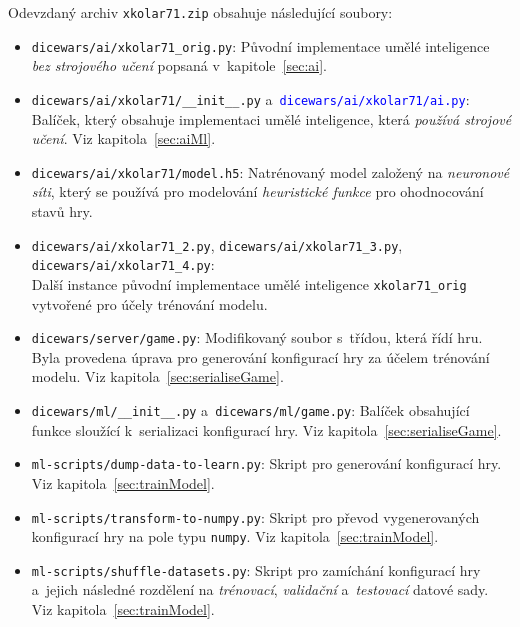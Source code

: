 \documentclass[11pt, a4paper]{article}
\theoremstyle{definition}
\begin{document}
Odevzdaný archiv \texttt{xkolar71.zip} obsahuje následující soubory:
\begin{itemize}
    \item
        \texttt{dicewars/ai/xkolar71\_orig.py}: Původní implementace umělé
        inteligence \emph{bez strojového učení} popsaná
        v~kapitole~\ref{sec:ai}.

    \item
        \texttt{dicewars/ai/xkolar71/\_\_init\_\_.py}
        a~\textcolor{blue}{\texttt{dicewars/ai/xkolar71/ai.py}}: Balíček,
        který obsahuje implementaci umělé inteligence, která \emph{používá
        strojové učení}. Viz kapitola~\ref{sec:aiMl}.

    \item
        \texttt{dicewars/ai/xkolar71/model.h5}: Natrénovaný model založený
        na \emph{neuronové síti}, který se používá pro modelování
        \emph{heuristické funkce} pro ohodnocování stavů hry.

    \item
        \texttt{dicewars/ai/xkolar71\_2.py},
        \texttt{dicewars/ai/xkolar71\_3.py},
        \texttt{dicewars/ai/xkolar71\_4.py}: \\
        Další instance původní implementace umělé inteligence
        \texttt{xkolar71\_orig} vytvořené pro účely trénování modelu.

    \item
        \texttt{dicewars/server/game.py}: Modifikovaný soubor s~třídou, která
        řídí hru. Byla provedena úprava pro generování konfigurací hry za
        účelem trénování modelu. Viz kapitola~\ref{sec:serialiseGame}.

    \item
        \texttt{dicewars/ml/\_\_init\_\_.py} a~\texttt{dicewars/ml/game.py}:
        Balíček obsahující funkce sloužící k~serializaci konfigurací hry.
        Viz kapitola~\ref{sec:serialiseGame}.

    \item
        \texttt{ml-scripts/dump-data-to-learn.py}: Skript pro generování
        konfigurací hry. Viz kapitola~\ref{sec:trainModel}.

    \item
        \texttt{ml-scripts/transform-to-numpy.py}: Skript pro převod
        vygenerovaných konfigurací hry na pole typu \texttt{numpy}. Viz
        kapitola~\ref{sec:trainModel}.

    \item
        \texttt{ml-scripts/shuffle-datasets.py}: Skript pro zamíchání
        konfigurací hry a~jejich následné rozdělení na \emph{trénovací},
        \emph{validační} a~\emph{testovací} datové sady. Viz
        kapitola~\ref{sec:trainModel}.


\end{itemize}
\end{document}
